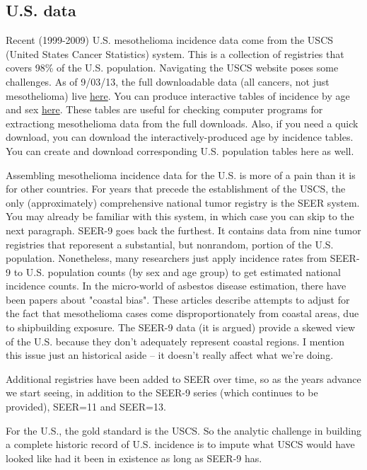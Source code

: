 \documentclass{article}\usepackage{graphicx, color}
\begin{document}
\subsection{U.S. data}

Recent (1999-2009) U.S. mesothelioma incidence data come from the USCS (United States Cancer Statistics) system.  This is a collection of registries that covers 98\% of the U.S. population.  Navigating the USCS website poses some challenges.  As of 9/03/13, the full downloadable data (all cancers, not just mesothelioma) live \href{http://www.cdc.gov/cancer/npcr/uscs/download_data.htm}{here}.  You can produce interactive tables of incidence by age and sex \href{http://apps.nccd.cdc.gov/uscs/cancersbyraceandethnicity.aspx}{here}.  These tables are useful for checking computer programs for extractiong mesothelioma data from the full downloads.  Also, if you need a quick download, you can download the interactively-produced age by incidence tables.  You can create and download corresponding U.S. population tables here as well. 

Assembling mesothelioma incidence data for the U.S. is more of a pain than it is for other countries.  For years that precede the establishment of the USCS, the only (approximately) comprehensive national tumor registry is the SEER system.  You may already be familiar with this system, in which case you can skip to the next paragraph.  SEER-9 goes back the furthest.  It contains data from nine tumor registries that reporesent a substantial, but nonrandom, portion of the U.S. population.  Nonetheless, many researchers just apply incidence rates from SEER-9 to U.S. population counts (by sex and age group) to get estimated national incidence counts.  In the micro-world of asbestos disease estimation, there have been papers about "coastal bias".  These articles describe attempts to adjust for the fact that mesothelioma cases come disproportionately from coastal areas, due to shipbuilding exposure.  The SEER-9 data (it is argued) provide a skewed view of the U.S. because they don't adequately represent coastal regions.  I mention this issue just an historical aside -- it doesn't really affect what we're doing.

Additional registries have been added to SEER over time, so as the years advance we start seeing, in addition to the SEER-9 series (which continues to be provided), SEER=11 and SEER=13.

For the U.S., the gold standard is the USCS.  So the analytic challenge in building a complete historic record of U.S. incidence is to impute what USCS would have looked like had it been in existence as long as SEER-9 has.
\end{document}
